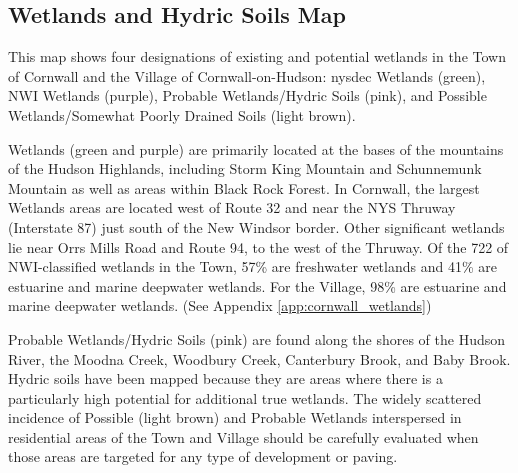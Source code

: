 \subsection*{Wetlands and Hydric Soils Map}
This map shows four designations of existing and potential wetlands in the Town 
of Cornwall and the Village of Cornwall-on-Hudson: \gls{nysdec} Wetlands 
(green), NWI Wetlands (purple), Probable Wetlands/Hydric Soils (pink), and 
Possible Wetlands/Somewhat Poorly Drained Soils (light brown). 

Wetlands (green and purple) are primarily located at the bases of the mountains 
of the Hudson Highlands, including Storm King Mountain and Schunnemunk Mountain 
as well as areas within Black Rock Forest. In Cornwall, the largest Wetlands 
areas are located west of Route 32 and near the NYS Thruway (Interstate 87) just 
south of the New Windsor border. Other significant wetlands lie near Orrs Mills 
Road and Route 94, to the west of the Thruway. Of the 722 of NWI-classified 
wetlands in the Town, 57\% are freshwater wetlands and 41\% are estuarine and 
marine deepwater wetlands. For the Village, 98\% are estuarine and marine 
deepwater wetlands. (See Appendix \ref{app:cornwall_wetlands})

Probable Wetlands/Hydric Soils (pink) are found along the shores of the Hudson 
River, the Moodna Creek, Woodbury Creek, Canterbury Brook, and Baby Brook. 
Hydric soils have been mapped because they are areas where there is a 
particularly high potential for additional true wetlands. The widely scattered 
incidence of Possible (light brown) and Probable Wetlands interspersed in 
residential areas of the Town and Village should be carefully evaluated when 
those areas are targeted for any type of development or paving.
\label{map:wetlandsandhydricsoils}




